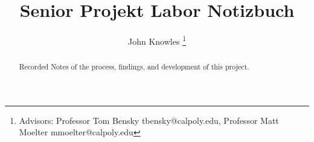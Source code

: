 \documentclass[journal, a4paper]{IEEEtran}
\begin{document}
	\title{Senior Projekt Labor Notizbuch}
	\author{John Knowles
	\thanks{Advisors: Professor Tom Bensky tbensky@calpoly.edu, Professor Matt Moelter mmoelter@calpoly.edu}}
	\maketitle

\begin{abstract}
	Recorded Notes of the process, findings, and development of this project.
\end{abstract}

\end{document}
